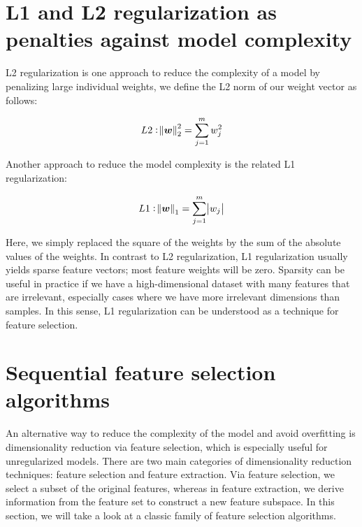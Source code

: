 \documentclass[11pt]{article}
\newcommand{\vect}[1]{\boldsymbol{#1}}
\begin{document}
    \section{L1 and L2 regularization as penalties against model complexity} \label{sec:l1_l2_regularization}

    L2 regularization is one approach to reduce the complexity of a model by penalizing large individual weights, we define the L2 norm of our weight vector \vect{w} as follows:

    \begin{equation} \label{eq:l2_regularization}
        L2: \norm{\vect{w}}_2^2 = \sum \limits_{j=1}^m w_j^2
    \end{equation}

    Another approach to reduce the model complexity is the related L1 regularization:

    \begin{equation}
        L1: \norm{\vect{w}}_1 = \sum \limits_{j=1}^m \abs{w_j}
    \end{equation}

    Here, we simply replaced the square of the weights by the sum of the absolute values of the weights.
    In contrast to L2 regularization, L1 regularization usually yields sparse feature vectors;
    most feature weights will be zero.
    Sparsity can be useful in practice if we have a high-dimensional dataset with many features that are irrelevant, especially cases where we have more irrelevant dimensions than samples.
    In this sense, L1 regularization can be understood as a technique for feature selection.

    \section{Sequential feature selection algorithms} \label{sec:sequential_feature_selection_algorithms}

    An alternative way to reduce the complexity of the model and avoid overfitting is dimensionality reduction via feature selection, which is especially useful for unregularized models.
    There are two main categories of dimensionality reduction techniques: feature selection and feature extraction.
    Via feature selection, we select a subset of the original features, whereas in feature extraction, we derive information from the feature set to construct a new feature subspace.
    In this section, we will take a look at a classic family of feature selection algorithms.
\end{document}
